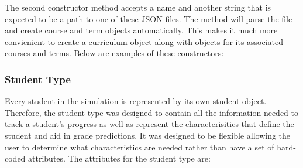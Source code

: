 \documentclass[botnum, fleqn]{unmeethesis}
\begin{document}


The second constructor method accepts a name and another string that is expected to be a path to one of these JSON files. The method will parse the file and create course and term objects automatically. This makes it much more convienient to create a curriculum object along with objects for its associated courses and terms. Below are examples of these constructors:



\subsubsection{Student Type}

Every student in the simulation is represented by its own student object. Therefore, the student type was designed to contain all the information needed to track a student's progress as well as represent the characterisitics that define the student and aid in grade predictions. It was designed to be flexible allowing the user to determine what characteristics are needed rather than have a set of hard-coded attributes. The attributes for the student type are:
\end{document}
